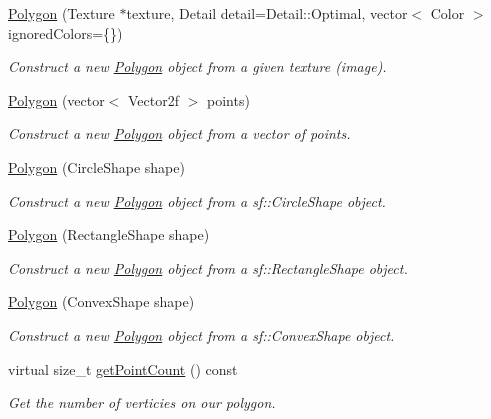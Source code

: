 \begin{DoxyCompactItemize}
\item 
\mbox{\hyperlink{class_polygon_a55f28f7bcae8df65ea11b99ff192b7d7}{Polygon}} (Texture $\ast$texture, Detail detail=Detail\+::\+Optimal, vector$<$ Color $>$ ignored\+Colors=\{\})
\begin{DoxyCompactList}\small\item\em Construct a new \mbox{\hyperlink{class_polygon}{Polygon}} object from a given texture (image). \end{DoxyCompactList}\item 
\mbox{\hyperlink{class_polygon_ac44cbd15f8a7a389d9f553e1bdeceea0}{Polygon}} (vector$<$ Vector2f $>$ points)
\begin{DoxyCompactList}\small\item\em Construct a new \mbox{\hyperlink{class_polygon}{Polygon}} object from a vector of points. \end{DoxyCompactList}\item 
\mbox{\hyperlink{class_polygon_abb2febc822883a9bbc7fdfac64475539}{Polygon}} (Circle\+Shape shape)
\begin{DoxyCompactList}\small\item\em Construct a new \mbox{\hyperlink{class_polygon}{Polygon}} object from a sf\+::\+Circle\+Shape object. \end{DoxyCompactList}\item 
\mbox{\hyperlink{class_polygon_ac83748b0a87551cc4e190254303f9911}{Polygon}} (Rectangle\+Shape shape)
\begin{DoxyCompactList}\small\item\em Construct a new \mbox{\hyperlink{class_polygon}{Polygon}} object from a sf\+::\+Rectangle\+Shape object. \end{DoxyCompactList}\item 
\mbox{\hyperlink{class_polygon_a37104a58675193c3598c19b41f4eadda}{Polygon}} (Convex\+Shape shape)
\begin{DoxyCompactList}\small\item\em Construct a new \mbox{\hyperlink{class_polygon}{Polygon}} object from a sf\+::\+Convex\+Shape object. \end{DoxyCompactList}\item 
virtual size\+\_\+t \mbox{\hyperlink{class_polygon_af16db77f60fa0f12b72cf0517aca0669}{get\+Point\+Count}} () const
\begin{DoxyCompactList}\small\item\em Get the number of verticies on our polygon. \end{DoxyCompactList}\item 

\end{DoxyCompactItemize}
